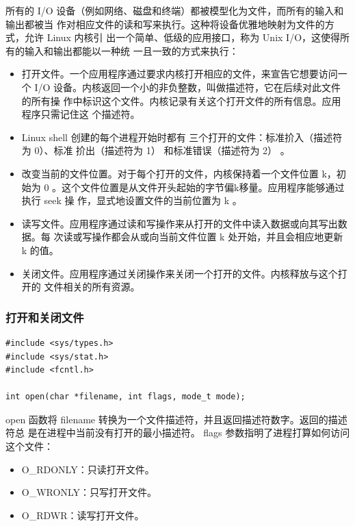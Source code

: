 所有的 I/O 设备（例如网络、磁盘和终端）都被模型化为文件，而所有的输入和输出都被当
作对相应文件的读和写来执行。这种将设备优雅地映射为文件的方式，允许 Linux 内核引
出一个简单、低级的应用接口，称为 Unix I/O，这使得所有的输入和输出都能以一种统
一且一致的方式来执行：
\begin{itemize}
    \item 打开文件。一个应用程序通过要求内核打开相应的文件，来宣告它想要访问一个
          I/O 设备。内核返回一个小的非负整数，叫做描述符，它在后续对此文件的所有操
          作中标识这个文件。内核记录有关这个打开文件的所有信息。应用程序只需记住这
          个描述符。
    \item Linux shell 创建的每个进程开始时都有 三个打开的文件：标准扴入（描述符为 0）、标准
          扴出（描述符为 1） 和标准错误（描述符为 2） 。
    \item 改变当前的文件位置。对于每个打开的文件，内核保持着一个文件位置 k，初始为
          0 。这个文件位置是从文件开头起始的字节偏k移量。应用程序能够通过执行 seek 操
          作，显式地设置文件的当前位置为 k 。
    \item 读写文件。应用程序通过读和写操作来从打开的文件中读入数据或向其写出数据。每
          次读或写操作都会从或向当前文件位置 k 处开始，并且会相应地更新 k 的值。
    \item 关闭文件。应用程序通过关闭操作来关闭一个打开的文件。内核释放与这个打开的
          文件相关的所有资源。
\end{itemize}

\subsubsection{打开和关闭文件}

\begin{lstlisting}[style=CStyle]
#include <sys/types.h>
#include <sys/stat.h>
#include <fcntl.h>

int open(char *filename, int flags, mode_t mode);
\end{lstlisting}

open 函数将 filename 转换为一个文件描述符，并且返回描述符数字。返回的描述符总
是在进程中当前没有打开的最小描述符。 flags 参数指明了进程打算如何访问这个文件：
\begin{itemize}
    \item O\_RDONLY：只读打开文件。
    \item O\_WRONLY：只写打开文件。
    \item O\_RDWR：读写打开文件。
\end{itemize}

